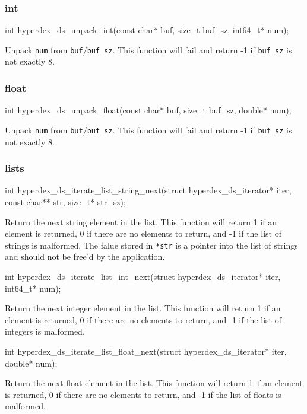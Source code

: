 \subsubsection{int}

\begin{ccode}
int hyperdex_ds_unpack_int(const char* buf, size_t buf_sz, int64_t* num);
\end{ccode}
\funcdesc Unpack \texttt{num} from \texttt{buf}/\texttt{buf\_sz}.  This function
will fail and return -1 if \texttt{buf\_sz} is not exactly \unit{8}{\byte}.

\subsubsection{float}

\begin{ccode}
int hyperdex_ds_unpack_float(const char* buf, size_t buf_sz, double* num);
\end{ccode}
\funcdesc Unpack \texttt{num} from \texttt{buf}/\texttt{buf\_sz}.  This function
will fail and return -1 if \texttt{buf\_sz} is not exactly \unit{8}{\byte}.

\subsubsection{lists}

\begin{ccode}
int hyperdex_ds_iterate_list_string_next(struct hyperdex_ds_iterator* iter,
                                         const char** str, size_t* str_sz);
\end{ccode}
\funcdesc Return the next string element in the list.  This function will return
1 if an element is returned, 0 if there are no elements to return, and -1 if the
list of strings is malformed.  The falue stored in \texttt{*str} is a pointer
into the list of strings and should not be free'd by the application.

\funcsep
\begin{ccode}
int hyperdex_ds_iterate_list_int_next(struct hyperdex_ds_iterator* iter, int64_t* num);
\end{ccode}
\funcdesc Return the next integer element in the list.  This function will
return 1 if an element is returned, 0 if there are no elements to return, and -1
if the list of integers is malformed.

\funcsep
\begin{ccode}
int hyperdex_ds_iterate_list_float_next(struct hyperdex_ds_iterator* iter, double* num);
\end{ccode}
\funcdesc Return the next float element in the list.  This function will return
1 if an element is returned, 0 if there are no elements to return, and -1 if the
list of floats is malformed.

